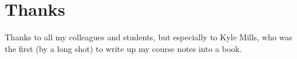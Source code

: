 \documentclass[10pt, a5paper, twoside, openany]{memoir}
\begin{document}
\section{Thanks}

Thanks to all my colleagues and students, but especially to Kyle Mills, who was the first (by a long shot) to write up my course notes into a book.

\mainmatter














%
\end{document}
